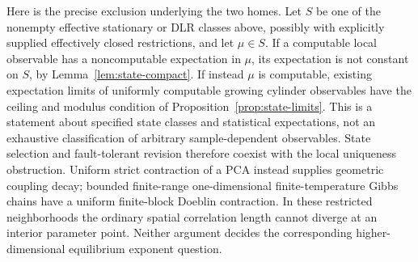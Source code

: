 Here is the precise exclusion underlying the two homes. Let $S$ be
one of the nonempty effective stationary or DLR classes above,
possibly with explicitly supplied effectively closed restrictions,
and let $\mu\in S$. If a computable local observable has a
noncomputable expectation in $\mu$, its expectation is not constant
on $S$, by Lemma~\ref{lem:state-compact}. If instead $\mu$ is
computable, existing expectation limits of uniformly computable
growing cylinder observables have the ceiling and modulus condition
of Proposition~\ref{prop:state-limits}. This is a statement about
specified state classes and statistical expectations, not an
exhaustive classification of arbitrary sample-dependent observables.
State selection and fault-tolerant revision therefore coexist with
the local uniqueness obstruction.
Uniform strict contraction of a PCA instead supplies geometric
coupling decay; bounded finite-range one-dimensional finite-temperature
Gibbs chains have a uniform finite-block Doeblin contraction. In
these restricted neighborhoods the ordinary spatial correlation
length cannot diverge at an interior parameter point. Neither
argument decides the corresponding higher-dimensional equilibrium
exponent question.
